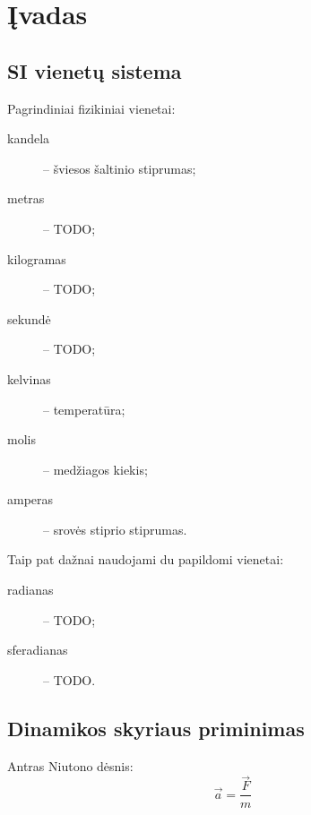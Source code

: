 \chapter{Įvadas}

\section{SI vienetų sistema}

Pagrindiniai fizikiniai vienetai:
\begin{description}
  \item[kandela] – šviesos šaltinio stiprumas;
  \item[metras] – TODO;
  \item[kilogramas] – TODO;
  \item[sekundė] – TODO;
  \item[kelvinas] – temperatūra;
  \item[molis] – medžiagos kiekis;
  \item[amperas] – srovės stiprio stiprumas.
\end{description}

Taip pat dažnai naudojami du papildomi vienetai:
\begin{description}
  \item[radianas] – TODO;
  \item[sferadianas] – TODO.
\end{description}

\section{Dinamikos skyriaus priminimas}

Antras Niutono dėsnis:
\begin{equation*}
  \vec{a} = \frac{\vec{F}}{m}
\end{equation*}

